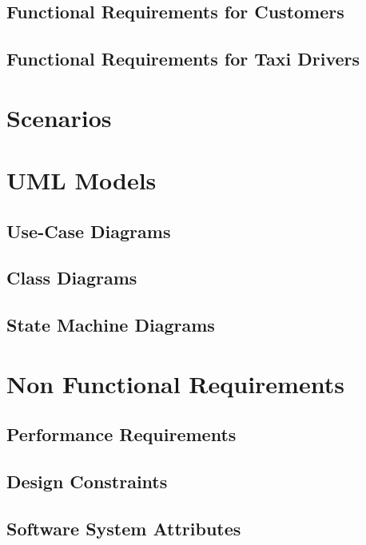 \documentclass{report}
\begin{document}
		\subsection{Functional Requirements for Customers}



		\subsection{Functional Requirements for Taxi Drivers}


	\section{Scenarios}


	\section{UML Models}

		\subsection{Use-Case Diagrams}

		\subsection{Class Diagrams}

		\subsection{State Machine Diagrams}

	\section{Non Functional Requirements}

		\subsection{Performance Requirements}

		\subsection{Design Constraints}

		\subsection{Software System Attributes}
\end{document}
